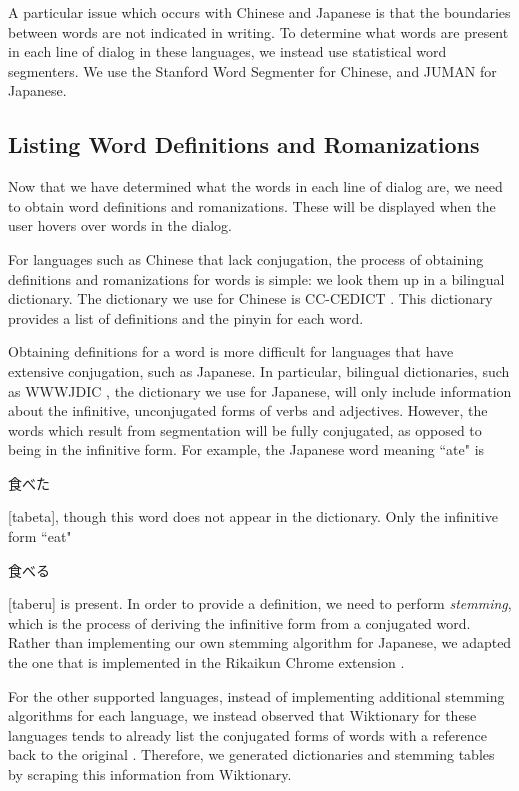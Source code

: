 \documentclass{sigchi}
\begin{document}
A particular issue which occurs with Chinese and Japanese is that the boundaries between
words are not indicated in writing. To determine what words are present
in each line of dialog in these languages, we instead use statistical word segmenters. We use the Stanford Word Segmenter \cite{stanfordsegmenter} for Chinese, and JUMAN \cite{juman} for Japanese.

\subsection{Listing Word Definitions and Romanizations}

Now that we have determined what the words in each line of dialog are, we need
to obtain word definitions and romanizations. These will be displayed when
the user hovers over words in the dialog.

For languages such as Chinese that lack conjugation, the process of obtaining definitions and romanizations for words is simple: we look them up in a bilingual dictionary. The dictionary we use for Chinese is CC-CEDICT \cite{mdbg}. This dictionary provides a list of definitions and the pinyin for each word.

Obtaining definitions for a word is more difficult for languages that have extensive conjugation, such as Japanese. In particular, bilingual dictionaries, such as WWWJDIC \cite{wwwjdic}, the dictionary we use for Japanese, will only include information about the infinitive, unconjugated forms of verbs and adjectives. However, the words which result from segmentation will be fully conjugated, as opposed to being in the infinitive form. For example, the Japanese word meaning ``ate" is \begin{CJK}{UTF8}{min}食べた\end{CJK} [tabeta], though this word does not appear in the dictionary. Only the infinitive form ``eat" \begin{CJK}{UTF8}{min}食べる\end{CJK} [taberu] is present. In order to provide a definition, we need to perform \emph{stemming}, which is the process of deriving the infinitive form from a conjugated word. Rather than implementing our own stemming algorithm for Japanese, we adapted the one that is implemented in the Rikaikun Chrome extension \cite{rikaikun}.

For the other supported languages, instead of implementing additional stemming algorithms for each language, we instead observed that Wiktionary for these languages tends to already list the conjugated forms of words with a reference back to the original \cite{wiktionary}. Therefore, we generated dictionaries and stemming tables by scraping this information from Wiktionary.
\end{document}
